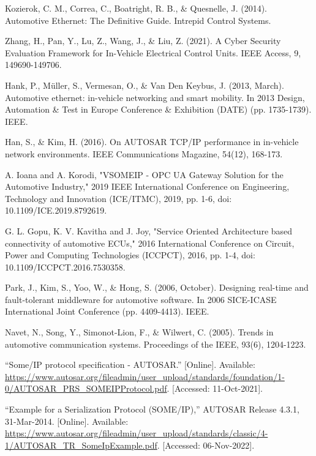 \documentclass[a4paper, 12pt, oneside, BCOR1cm,toc=chapterentrywithdots]{scrbook}
\begin{document}
\begin{thebibliography}{00}
Kozierok, C. M., Correa, C., Boatright, R. B., \& Quesnelle, J. (2014). Automotive Ethernet: The Definitive Guide. Intrepid Control Systems.

Zhang, H., Pan, Y., Lu, Z., Wang, J., \& Liu, Z. (2021). A Cyber Security Evaluation Framework for In-Vehicle Electrical Control Units. IEEE Access, 9, 149690-149706.

Hank, P., Müller, S., Vermesan, O., \& Van Den Keybus, J. (2013, March). Automotive ethernet: in-vehicle networking and smart mobility. In 2013 Design, Automation \& Test in Europe Conference \& Exhibition (DATE) (pp. 1735-1739). IEEE.

Han, S., \& Kim, H. (2016). On AUTOSAR TCP/IP performance in in-vehicle network environments. IEEE Communications Magazine, 54(12), 168-173.

A. Ioana and A. Korodi, "VSOMEIP - OPC UA Gateway Solution for the Automotive Industry," 2019 IEEE International Conference on Engineering, Technology and Innovation (ICE/ITMC), 2019, pp. 1-6, doi: 10.1109/ICE.2019.8792619.

G. L. Gopu, K. V. Kavitha and J. Joy, "Service Oriented Architecture based connectivity of automotive ECUs," 2016 International Conference on Circuit, Power and Computing Technologies (ICCPCT), 2016, pp. 1-4, doi: 10.1109/ICCPCT.2016.7530358.

Park, J., Kim, S., Yoo, W., \& Hong, S. (2006, October). Designing real-time and fault-tolerant middleware for automotive software. In 2006 SICE-ICASE International Joint Conference (pp. 4409-4413). IEEE.

Navet, N., Song, Y., Simonot-Lion, F., \& Wilwert, C. (2005). Trends in automotive communication systems. Proceedings of the IEEE, 93(6), 1204-1223.

“Some/IP protocol specification - AUTOSAR.” [Online]. Available: \url{https://www.autosar.org/fileadmin/user\_upload/standards/foundation/1-0/AUTOSAR\_PRS\_SOMEIPProtocol.pdf}. [Accessed: 11-Oct-2021]. 

“Example for a Serialization Protocol (SOME/IP),” AUTOSAR Release 4.3.1, 31-Mar-2014. [Online]. Available: \url{https://www.autosar.org/fileadmin/user\_upload/standards/classic/4-1/AUTOSAR\_TR\_SomeIpExample.pdf}. [Accessed: 06-Nov-2022]. 


\end{thebibliography}
\end{document}
